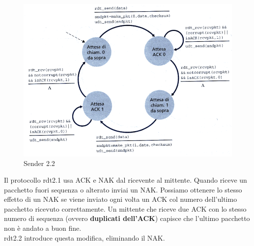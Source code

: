 \documentclass[11pt,a4paper]{book}
\begin{document}
\begin{figure}
		\includegraphics[scale=0.6]{img/020.png}
		\caption{Sender 2.2}
\end{figure}
Il protocollo rdt2.1 usa ACK e NAK dal ricevente al mittente. Quando riceve un pacchetto fuori sequenza o alterato inviai un NAK. Possiamo ottenere lo stesso effetto di un NAK se viene inviato ogni volta un ACK col numero dell'ultimo pacchetto ricevuto correttamente. Un mittente che riceve due ACK con lo stesso numero di sequenza (ovvero \textbf{duplicati dell'ACK}) capisce che l'ultimo pacchetto non è andato a buon fine. \\
rdt2.2 introduce questa modifica, eliminando il NAK.
\end{document}
